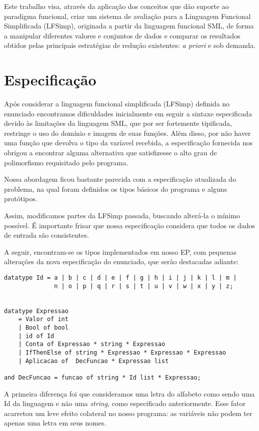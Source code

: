\documentclass[brazil,times]{abnt}
\begin{document}
Este trabalho visa, através da aplicação dos conceitos que dão suporte ao paradigma funcional, criar um sistema de avaliação para a Linguagem Funcional Simplificada (LFSimp), originada a partir da linguagem funcional SML, de forma a manipular diferentes valores e conjuntos de dados e comparar os resultados obtidos pelas principais estratégias de redução existentes: \textit{a priori} e sob demanda.

\chapter{Especificação}

Após considerar a linguagem funcional simplificada (LFSimp) definida no enunciado encontramos dificuldades inicialmente em seguir a sintaxe especificada devido às limitações da linguagem SML, que por ser fortemente tipificada, restringe o uso do domínio e imagem de suas funções. Além disso, por não haver uma função que devolva o tipo da varíavel recebida, a especificação fornecida nos obrigou a encontrar alguma alternativa que satisfizesse o alto grau de polimorfismo requisitado pelo programa. 

Nossa abordagem ficou bastante parecida com a especificação atualizada do problema, na qual foram definidos os tipos básicos do programa e alguns protótipos.

Assim, modificamos partes da LFSimp passada, buscando alterá-la o mínimo possível. É importante frisar que nossa especificação considera que todos os dados de entrada são consistentes. 

A seguir, encontram-se os tipos implementados em nosso EP, com pequenas alterações da nova especificação do enunciado, que serão destacadas adiante:

\begin{verbatim}
datatype Id = a | b | c | d | e | f | g | h | i | j | k | l | m |
			  n | o | p | q | r | s | t | u | v | w | x | y | z;


datatype Expressao
	= Valor of int
	| Bool of bool
	| id of Id
	| Conta of Expressao * string * Expressao
	| IfThenElse of string * Expressao * Expressao * Expressao
	| Aplicacao of  DecFuncao * Expressao list

and DecFuncao = funcao of string * Id list * Expressao;
\end{verbatim}

A primeira diferença foi que consideramos uma letra do alfabeto como sendo uma Id da linguagem e não uma \textit{string}, como especificado anteriormente. Esse fator acarretou um leve efeito colateral no nosso programa: as variáveis não podem ter apenas uma letra em seus nomes.
\end{document}
